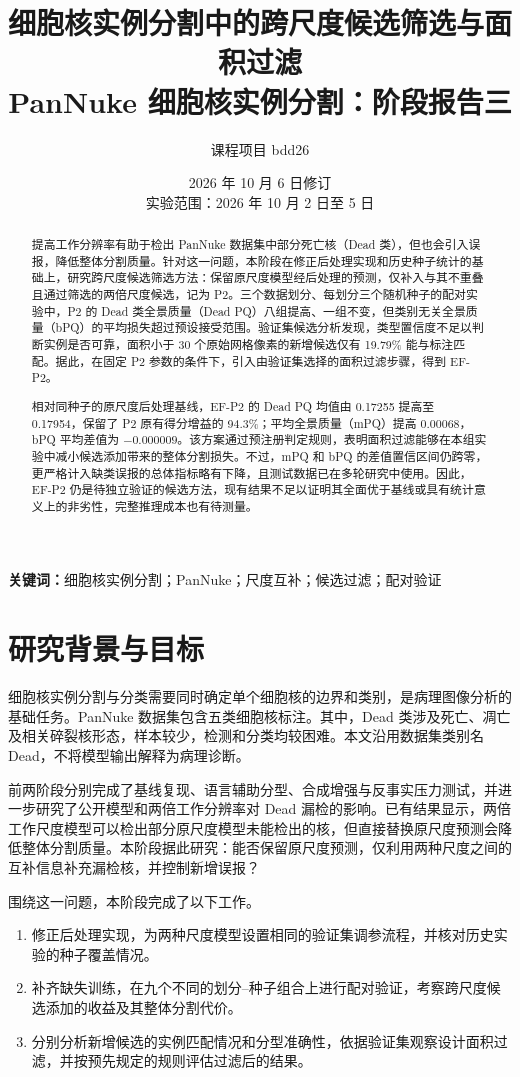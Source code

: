 \documentclass[11pt,a4paper,UTF8,fontset=fandol]{ctexart}
\title{\bfseries 细胞核实例分割中的跨尺度候选筛选与面积过滤\\[7pt]
\large PanNuke 细胞核实例分割：阶段报告三}
\author{课程项目 bdd26}
\date{2026 年 10 月 6 日修订\\\small 实验范围：2026 年 10 月 2 日至 5 日}
\begin{document}
\maketitle

\begin{abstract}
提高工作分辨率有助于检出 PanNuke 数据集中部分死亡核（Dead 类），但也会引入误报，降低整体分割质量。针对这一问题，本阶段在修正后处理实现和历史种子统计的基础上，研究跨尺度候选筛选方法：保留原尺度模型经后处理的预测，仅补入与其不重叠且通过筛选的两倍尺度候选，记为 P2。三个数据划分、每划分三个随机种子的配对实验中，P2 的 Dead 类全景质量（Dead PQ）八组提高、一组不变，但类别无关全景质量（bPQ）的平均损失超过预设接受范围。验证集候选分析发现，类型置信度不足以判断实例是否可靠，面积小于 30 个原始网格像素的新增候选仅有 19.79\% 能与标注匹配。据此，在固定 P2 参数的条件下，引入由验证集选择的面积过滤步骤，得到 EF-P2。

相对同种子的原尺度后处理基线，EF-P2 的 Dead PQ 均值由 0.17255 提高至 0.17954，保留了 P2 原有得分增益的 94.3\%；平均全景质量（mPQ）提高 0.00068，bPQ 平均差值为 $-0.000009$。该方案通过预注册判定规则，表明面积过滤能够在本组实验中减小候选添加带来的整体分割损失。不过，mPQ 和 bPQ 的差值置信区间仍跨零，更严格计入缺类误报的总体指标略有下降，且测试数据已在多轮研究中使用。因此，EF-P2 仍是待独立验证的候选方法，现有结果不足以证明其全面优于基线或具有统计意义上的非劣性，完整推理成本也有待测量。
\end{abstract}
\noindent\textbf{关键词：}细胞核实例分割；PanNuke；尺度互补；候选过滤；配对验证

\section{研究背景与目标}

细胞核实例分割与分类需要同时确定单个细胞核的边界和类别，是病理图像分析的基础任务。PanNuke 数据集包含五类细胞核标注\cite{pannuke}。其中，Dead 类涉及死亡、凋亡及相关碎裂核形态，样本较少，检测和分类均较困难。本文沿用数据集类别名 Dead，不将模型输出解释为病理诊断。

前两阶段分别完成了基线复现、语言辅助分型、合成增强与反事实压力测试，并进一步研究了公开模型和两倍工作分辨率对 Dead 漏检的影响\cite{reports}。已有结果显示，两倍工作尺度模型可以检出部分原尺度模型未能检出的核，但直接替换原尺度预测会降低整体分割质量。本阶段据此研究：能否保留原尺度预测，仅利用两种尺度之间的互补信息补充漏检核，并控制新增误报？

围绕这一问题，本阶段完成了以下工作。
\begin{enumerate}
\item 修正后处理实现，为两种尺度模型设置相同的验证集调参流程，并核对历史实验的种子覆盖情况。
\item 补齐缺失训练，在九个不同的划分--种子组合上进行配对验证，考察跨尺度候选添加的收益及其整体分割代价。
\item 分别分析新增候选的实例匹配情况和分型准确性，依据验证集观察设计面积过滤，并按预先规定的规则评估过滤后的结果。
\end{enumerate}
\end{document}
